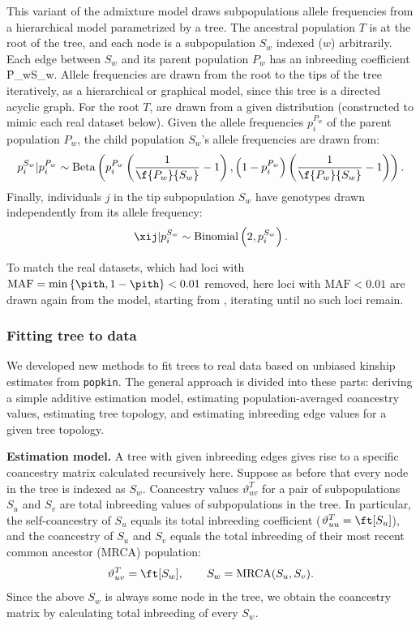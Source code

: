\documentclass[11pt]{article}
\begin{document}
This variant of the admixture model draws subpopulations allele frequencies from a hierarchical model parametrized by a tree.
The ancestral population $T$ is at the root of the tree, and each node is a subpopulation $S_w$ indexed ($w$) arbitrarily.
Each edge between $S_w$ and its parent population $P_w$ has an inbreeding coefficient \f{P_w}{S_w}.
Allele frequencies are drawn from the root to the tips of the tree iteratively, as a hierarchical or graphical model, since this tree is a directed acyclic graph.
For the root $T$, \pit are drawn from a given distribution (constructed to mimic each real dataset below).
Given the allele frequencies $p_i^{P_w}$ of the parent population $P_w$, the child population $S_w$'s allele frequencies are drawn from:
$$
p_i^{S_w} | p_i^{P_w}
\sim
\text{Beta} \left(
  p_i^{P_w} \left( \frac{1}{ \f{P_w}{S_w} } - 1 \right),
  \left( 1 - p_i^{P_w} \right) \left( \frac{1}{ \f{P_w}{S_w} } - 1 \right)
\right)
.
$$
Finally, individuals $j$ in the tip subpopulation $S_w$ have genotypes drawn independently from its allele frequency:
$$
\xij | p_i^{S_w}
\sim
\text{Binomial}\left( 2, p_i^{S_w} \right)
.
$$

To match the real datasets, which had loci with $\text{MAF} = \min \left\{ \pith, 1 - \pith \right\} < 0.01$ removed, here loci with $\text{MAF} < 0.01$ are drawn again from the model, starting from \pit, iterating until no such loci remain.

\subsubsection{Fitting tree to data}

We developed new methods to fit trees to real data based on unbiased kinship estimates from \texttt{popkin}.
The general approach is divided into these parts:
deriving a simple additive estimation model,
estimating population-averaged coancestry values,
estimating tree topology, and
estimating inbreeding edge values for a given tree topology.

\textbf{Estimation model.}
A tree with given inbreeding edges gives rise to a specific coancestry matrix calculated recursively here.
Suppose as before that every node in the tree is indexed as $S_w$.
Coancestry values $\vartheta_{uv}^T$ for a pair of subpopulations $S_u$ and $S_v$ are total inbreeding values of subpopulations in the tree.
In particular, the self-coancestry of $S_u$ equals its total inbreeding coefficient ($\vartheta_{uu}^T = \ft[S_u]$), and the coancestry of $S_u$ and $S_v$ equals the total inbreeding of their most recent common ancestor (MRCA) population:
$$
\vartheta_{uv}^T
=
\ft[ S_w ]
,
\quad\quad
S_w = \text{MRCA}( S_u, S_v )
.
$$
Since the above $S_w$ is always some node in the tree, we obtain the coancestry matrix by calculating total inbreeding of every $S_w$.
\end{document}
